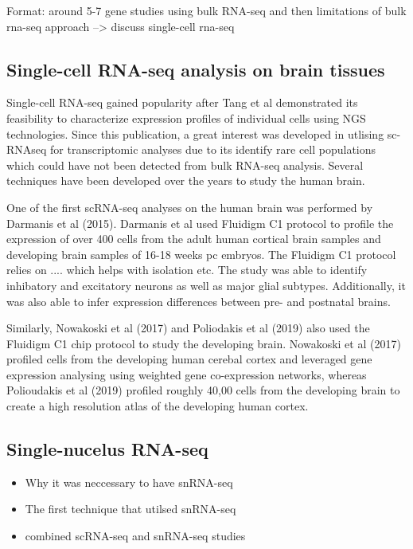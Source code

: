 \documentclass[12pt]{article}
\begin{document}
Format: around 5-7 gene studies using bulk RNA-seq and then limitations of bulk rna-seq approach --> discuss single-cell rna-seq

\subsection{Single-cell RNA-seq analysis on brain tissues}

Single-cell RNA-seq gained popularity after Tang et al demonstrated its feasibility to characterize expression profiles of individual cells using NGS technologies. Since this publication, a great interest was developed in utlising sc-RNAseq for transcriptomic analyses due to its identify rare cell populations which could have not been detected from bulk RNA-seq analysis.  Several techniques have been developed over the years to study the human brain. 

One of the first scRNA-seq analyses on the human brain was performed by Darmanis et al (2015). Darmanis et al used Fluidigm C1 protocol to profile the expression of over 400 cells from the adult human cortical brain samples and developing brain samples of 16-18 weeks pc embryos. 
The Fluidigm C1 protocol relies on .... which helps with isolation etc. 
The study was able to identify inhibatory and excitatory neurons as well as major glial subtypes. Additionally, it was also able to infer expression differences between pre- and postnatal brains.  

Similarly, Nowakoski et al (2017) and Poliodakis et al (2019) also used the Fluidigm C1 chip protocol to study the developing brain.
Nowakoski et al (2017) profiled cells from the developing human cerebal cortex and leveraged gene expression analysing using weighted gene co-expression networks, whereas Polioudakis et al (2019) profiled roughly 40,00 cells from the developing brain to create a high resolution atlas of the developing human cortex. 



\subsection{Single-nucelus RNA-seq}

\begin{itemize}
	\item Why it was neccessary to have snRNA-seq
	\item The first technique that utilsed snRNA-seq 
	\item combined scRNA-seq and snRNA-seq studies 
\end{itemize}
\end{document}
